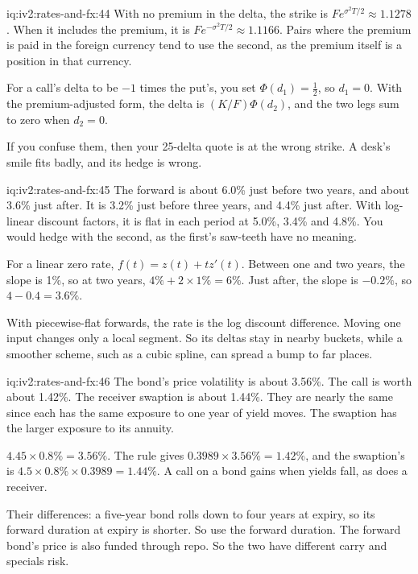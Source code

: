 \begin{solution}{iq:iv2:rates-and-fx:44}
With no premium in the delta, the strike is $Fe^{\sigma^2T/2} \approx 1.1278$. When it includes the premium, it is $Fe^{-\sigma^2T/2} \approx 1.1166$. Pairs where the premium is paid in the foreign currency tend to use the second, as the premium itself is a position in that currency.

For a call's delta to be $-1$ times the put's, you set $\Phi(d_1) = \tfrac12$, so $d_1 = 0$. With the premium-adjusted form, the delta is $(K/F)\Phi(d_2)$, and the two legs sum to zero when $d_2 = 0$.

If you confuse them, then your 25-delta quote is at the wrong strike. A desk's smile fits badly, and its hedge is wrong.

\end{solution}

\begin{solution}{iq:iv2:rates-and-fx:45}
The forward is about 6.0\% just before two years, and about 3.6\% just after. It is 3.2\% just before three years, and 4.4\% just after. With log-linear discount factors, it is flat in each period at 5.0\%, 3.4\% and 4.8\%. You would hedge with the second, as the first's saw-teeth have no meaning.

For a linear zero rate, $f(t) = z(t) + tz'(t)$. Between one and two years, the slope is 1\%, so at two years, $4\% + 2 \times 1\% = 6\%$. Just after, the slope is $-0.2\%$, so $4 - 0.4 = 3.6\%$.

With piecewise-flat forwards, the rate is the log discount difference. Moving one input changes only a local segment. So its deltas stay in nearby buckets, while a smoother scheme, such as a cubic spline, can spread a bump to far places.

\end{solution}

\begin{solution}{iq:iv2:rates-and-fx:46}
The bond's price volatility is about 3.56\%. The call is worth about 1.42\%. The receiver swaption is about 1.44\%. They are nearly the same since each has the same exposure to one year of yield moves. The swaption has the larger exposure to its annuity.

$4.45 \times 0.8\% = 3.56\%$. The rule gives $0.3989 \times 3.56\% = 1.42\%$, and the swaption's is $4.5 \times 0.8\% \times 0.3989 = 1.44\%$. A call on a bond gains when yields fall, as does a receiver.

Their differences: a five-year bond rolls down to four years at expiry, so its forward duration at expiry is shorter. So use the forward duration. The forward bond's price is also funded through repo. So the two have different carry and specials risk.

\end{solution}

